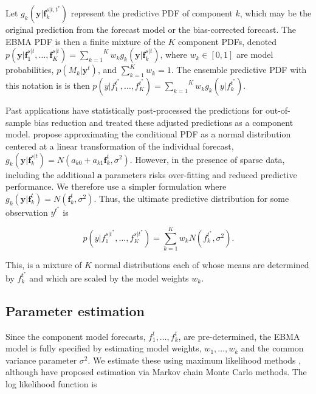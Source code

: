 \documentclass[12pt,fullpage,endnotes]{article}
\begin{document}
Let $g_k(\mathbf{y}|\mathbf{f}_k^{s|t, t^\ast})$ represent the
predictive PDF of component $k$, which may be the original prediction
from the forecast model or the bias-corrected forecast.  The EBMA PDF
is then a finite mixture of the $K$ component PDFs, denoted
$p(\mathbf{y}|\mathbf{f}_1^{s|t}, \ldots,
\mathbf{f}_K^{s|t})=\overset{K}{\underset{k=1}{\sum}} w_k
g_k(\mathbf{y}|\mathbf{f}_k^{s|t})$, where $w_k \in [0,1]$ are model
probabilities, $p(M_k|\mathbf{y}^t)$, and $\sum_{k=1}^Kw_k=1$. The
ensemble predictive PDF with this notation is is then
$p(y|f_{1}^{t^\ast}, \ldots,
f_{K}^{t^\ast})=\overset{K}{\underset{k=1}{\sum}} w_k
g_k(y|f_{k}^{t^*})$.



Past applications have statistically post-processed the predictions for
out-of-sample bias reduction and treated these adjusted predictions as a
component model. \citet{Raftery:2005} propose approximating the
conditional PDF as a normal distribution centered at a linear
transformation of the individual forecast,
$g_k(\mathbf{y}|\mathbf{f}_k^{s|t}) = N(a_{k0} +
a_{k1}\mathbf{f}_k^{t}, \sigma^2)$. However, in the presence of sparse
data, including the additional $\mathbf{a}$ parameters risks
over-fitting and reduced predictive performance.  We therefore use a
simpler formulation where $g_k(\mathbf{y}|\mathbf{f}_k^{t}) =
N(\mathbf{f}_k^{t}, \sigma^2)$.  Thus, the ultimate predictive
distribution for some observation $y^{t^\ast}$ is 

\begin{equation}
\label{pdf}p(y|f_1^{s|t^\ast},
\ldots, f_K^{s|t^\ast}) = \overset{K}{\underset{k=1}{\sum}} w_k
N(f_k^{t^\ast}, \sigma^2).
\end{equation}

\noindent This, is a mixture of $K$ normal distributions each of whose
means are determined by $f_k^{t^\ast}$ and which are scaled by the
model weights $w_k$.

\subsection{Parameter estimation}

Since the component model forecasts, $f^t_1, \ldots, f^t_k$, are
pre-determined, the EBMA model is fully specified by estimating model
weights, $w_1, \ldots, w_k$ and the common variance parameter
$\sigma^2$.  We estimate these using maximum likelihood methods
\citep{Raftery:2005}, although \citet{Vrugt:2008} have proposed
estimation via Markov chain Monte Carlo methods.  The log likelihood
function is
\end{document}
